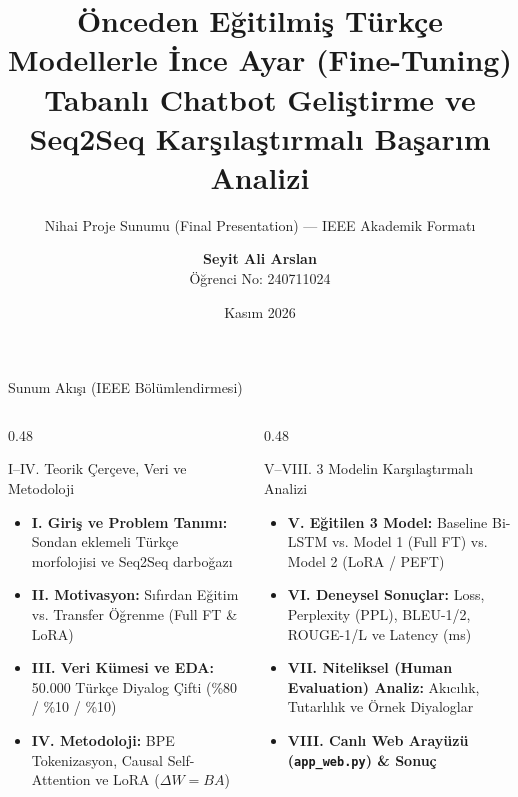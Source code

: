 \documentclass[aspectratio=169,10pt]{beamer}
\title[IEEE Final Sunum --- Deep Learning]{Önceden Eğitilmiş Türkçe Modellerle İnce Ayar (Fine-Tuning) Tabanlı Chatbot Geliştirme ve Seq2Seq Karşılaştırmalı Başarım Analizi}
\subtitle{Nihai Proje Sunumu (Final Presentation) --- IEEE Akademik Formatı}
\author[Seyit Ali Arslan (240711024)]{\textbf{Seyit Ali Arslan} \\ Öğrenci No: 240711024}
\institute[Atatürk Üniversitesi]{Yapay Zeka ve Veri Mühendisliği Bölümü\\Atatürk Üniversitesi, Erzurum, Türkiye\\Ders: Deep Learning (2026--2027)}
\date{Kasım 2026}
\begin{document}
\begin{frame}
    \titlepage
\end{frame}

\begin{frame}{Sunum Akışı (IEEE Bölümlendirmesi)}
    \begin{columns}[T]
        \begin{column}{0.48\textwidth}
            \begin{block}{I--IV. Teorik Çerçeve, Veri ve Metodoloji}
                \begin{itemize}
                    \item \textbf{I. Giriş ve Problem Tanımı:} Sondan eklemeli Türkçe morfolojisi ve Seq2Seq darboğazı
                    \item \textbf{II. Motivasyon:} Sıfırdan Eğitim vs. Transfer Öğrenme (Full FT \& LoRA)
                    \item \textbf{III. Veri Kümesi ve EDA:} 50.000 Türkçe Diyalog Çifti (\%80 / \%10 / \%10)
                    \item \textbf{IV. Metodoloji:} BPE Tokenizasyon, Causal Self-Attention ve LoRA ($\Delta W = BA$)
                \end{itemize}
            \end{block}
        \end{column}
        \begin{column}{0.48\textwidth}
            \begin{block}{V--VIII. 3 Modelin Karşılaştırmalı Analizi}
                \begin{itemize}
                    \item \textbf{V. Eğitilen 3 Model:} Baseline Bi-LSTM vs. Model 1 (Full FT) vs. Model 2 (LoRA / PEFT)
                    \item \textbf{VI. Deneysel Sonuçlar:} Loss, Perplexity (PPL), BLEU-1/2, ROUGE-1/L ve Latency (ms)
                    \item \textbf{VII. Niteliksel (Human Evaluation) Analiz:} Akıcılık, Tutarlılık ve Örnek Diyaloglar
                    \item \textbf{VIII. Canlı Web Arayüzü (\texttt{app\_web.py}) \& Sonuç}
                \end{itemize}
            \end{block}
        \end{column}
    \end{columns}
\end{frame}
\end{document}

